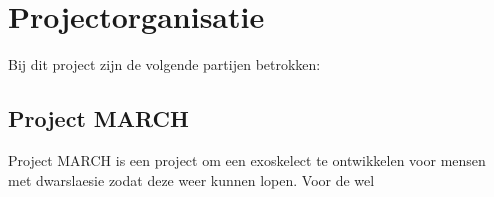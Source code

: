 \section{Projectorganisatie}
Bij dit project zijn de volgende partijen betrokken:

\subsection{Project MARCH}
Project MARCH is een project om een exoskelect te ontwikkelen voor mensen met dwarslaesie zodat deze weer kunnen lopen. Voor de wel 